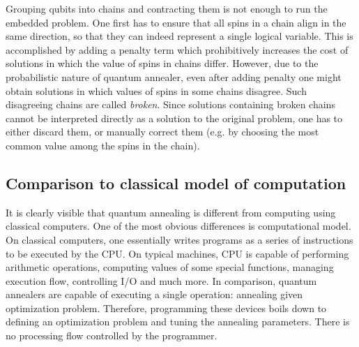 Grouping qubits into chains and contracting them is not enough to run the embedded problem. One first has to ensure that all spins in a chain align in the same direction, so that they can indeed represent a single logical variable. This is accomplished by adding a penalty term which prohibitively increases the cost of solutions in which the value of spins in chains differ. However, due to the probabilistic nature of quantum annealer, even after adding penalty one might obtain solutions in which values of spins in some chains disagree. Such disagreeing chains are called \emph{broken}. Since solutions containing broken chains cannot be interpreted directly as a solution to the original problem, one has to either discard them, or manually correct them (e.g. by choosing the most common value among the spins in the chain).


\subsection{Comparison to classical model of computation}
It is clearly visible that quantum annealing is different from computing using classical computers. One of the most obvious differences is computational model. On classical computers, one essentially writes programs as a series of instructions to be executed by the CPU. On typical machines, CPU is capable of performing arithmetic operations, computing values of some special functions, managing execution flow, controlling I/O and much more. In comparison, quantum annealers are capable of executing a single operation: annealing given optimization problem. Therefore, programming these devices boils down to defining an optimization problem and tuning the annealing parameters. There is no processing flow controlled by the programmer.


